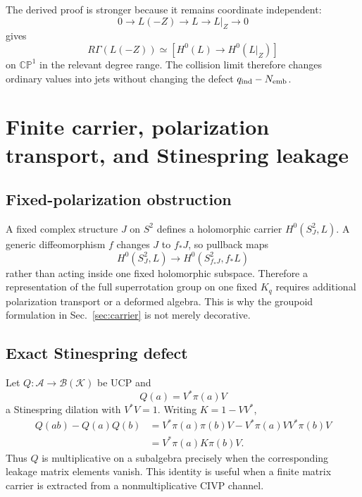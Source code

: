 \documentclass[aps,prd,preprint,nofootinbib,superscriptaddress]{revtex4-2}
\theoremstyle{definition}
\theoremstyle{remark}
\newcommand{\CP}{\mathbb{CP}}
\begin{document}
The derived proof is stronger because it remains coordinate independent:
\begin{equation}
0\to L(-Z)\to L\to L|_Z\to0
\end{equation}
gives
\begin{equation}
R\Gamma(L(-Z))
\simeq
\left[
H^0(L)\to H^0(L|_Z)
\right]
\end{equation}
on $\CP^1$ in the relevant degree range.  The collision limit therefore
changes ordinary values into jets without changing the defect
$q_{\rm ind}-N_{\rm emb}$.

\section{Finite carrier, polarization transport, and Stinespring leakage}
\label{app:carrier}

\subsection{Fixed-polarization obstruction}

A fixed complex structure $J$ on $S^2$ defines a holomorphic carrier
$H^0(S^2_J,L)$.  A generic diffeomorphism $f$ changes $J$ to $f_*J$, so
pullback maps
\begin{equation}
H^0(S^2_J,L)
\longrightarrow
H^0(S^2_{f_*J},f_*L)
\end{equation}
rather than acting inside one fixed holomorphic subspace.  Therefore a
representation of the full superrotation group on one fixed $K_q$ requires
additional polarization transport or a deformed algebra.  This is why the
groupoid formulation in Sec.~\ref{sec:carrier} is not merely decorative.

\subsection{Exact Stinespring defect}

Let $Q:\mathcal A\to\mathcal B(\mathcal K)$ be UCP and
\begin{equation}
Q(a)=V^*\pi(a)V
\end{equation}
a Stinespring dilation with $V^*V=1$.  Writing $K=1-VV^*$,
\begin{align}
Q(ab)-Q(a)Q(b)
&=
V^*\pi(a)\pi(b)V
-
V^*\pi(a)VV^*\pi(b)V
\nonumber\\
&=
V^*\pi(a)K\pi(b)V.
\end{align}
Thus $Q$ is multiplicative on a subalgebra precisely when the corresponding
leakage matrix elements vanish.  This identity is useful when a finite
matrix carrier is extracted from a nonmultiplicative CIVP channel.
\end{document}
